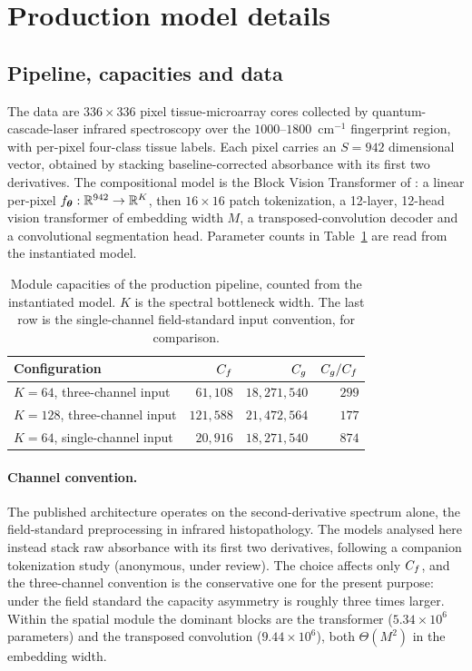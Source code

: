 \section{Production model details}
\label{app:production}

\subsection{Pipeline, capacities and data}
\label{app:prod_setup}

The data are $336 \times 336$ pixel tissue-microarray cores collected by
quantum-cascade-laser infrared spectroscopy over the $1000$--$1800$~cm$^{-1}$
fingerprint region, with per-pixel four-class tissue labels. Each pixel carries
an $S = 942$ dimensional vector, obtained by stacking baseline-corrected
absorbance with its first two derivatives. The compositional model is the Block
Vision Transformer of \citet{oleary2026spatial}: a linear per-pixel
$f_{\boldsymbol{\theta}} : \mathbb{R}^{942} \to \mathbb{R}^{K}$, then $16 \times 16$ patch tokenization, a
12-layer, 12-head vision transformer of embedding width $M$, a
transposed-convolution decoder and a convolutional segmentation head. Parameter
counts in Table~\ref{tab:app_capacity} are read from the instantiated model.

\begin{table}[htbp]
\centering
\caption{Module capacities of the production pipeline, counted from the
instantiated model. $K$ is the spectral bottleneck width. The last row is the
single-channel field-standard input convention, for comparison.}
\label{tab:app_capacity}
\begin{tabular}{lrrr}
\toprule
Configuration & $C_f$ & $C_g$ & $C_g/C_f$ \\
\midrule
$K = 64$, three-channel input  & $61{,}108$  & $18{,}271{,}540$ & $299$ \\
$K = 128$, three-channel input & $121{,}588$ & $21{,}472{,}564$ & $177$ \\
$K = 64$, single-channel input & $20{,}916$  & $18{,}271{,}540$ & $874$ \\
\bottomrule
\end{tabular}
\end{table}

\paragraph{Channel convention.} The published architecture operates on the
second-derivative spectrum alone, the field-standard preprocessing in infrared
histopathology. The models analysed here instead stack raw absorbance with its
first two derivatives, following a companion tokenization study (anonymous,
under review). The choice affects only $C_f$, and the three-channel convention
is the conservative one for the present purpose: under the field standard the
capacity asymmetry is roughly three times larger. Within the spatial module the
dominant blocks are the transformer ($5.34 \times 10^6$ parameters) and the
transposed convolution ($9.44 \times 10^6$), both $\Theta(M^2)$ in the
embedding width.

